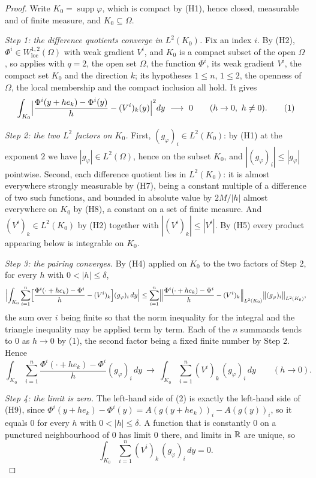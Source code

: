 \begin{proof}
Write $K_0=\operatorname{supp}\varphi$, which is compact by (H1), hence closed,
measurable and of finite measure, and $K_0\subseteq\Omega$.

\emph{Step 1: the difference quotients converge in $L^2(K_0)$.}  Fix an index
$i$.  By (H2), $\Phi^i\in W^{1,2}_{\mathrm{loc}}(\Omega)$ with weak gradient
$V^i$, and $K_0$ is a compact subset of the open $\Omega$, so
 applies with $q=2$, the open set
$\Omega$, the function $\Phi^i$, its weak gradient $V^i$, the compact set $K_0$
and the direction $k$; its hypotheses $1\le n$, $1\le2$, the openness of
$\Omega$, the local membership and the compact inclusion all hold.  It gives
\[
\int_{K_0}\Bigl|\frac{\Phi^i(y+he_k)-\Phi^i(y)}{h}-(V^i)_k(y)\Bigr|^2dy
\ \longrightarrow\ 0
\qquad(h\to0,\ h\ne0).
\tag{1}
\]

\emph{Step 2: the two $L^2$ factors on $K_0$.}  First,
$(g_\varphi)_i\in L^2(K_0)$: by (H1) at the exponent $2$ we have
$|g_\varphi|\in L^2(\Omega)$, hence on the subset $K_0$, and
$|(g_\varphi)_i|\le|g_\varphi|$ pointwise.  Second, each difference quotient
lies in $L^2(K_0)$: it is almost everywhere strongly measurable by (H7), being
a constant multiple of a difference of two such functions, and bounded in
absolute value by $2M/|h|$ almost everywhere on $K_0$ by (H8), a constant on a
set of finite measure.  And $(V^i)_k\in L^2(K_0)$ by (H2) together with
$|(V^i)_k|\le|V^i|$.  By (H5) every product appearing below is integrable on
$K_0$.

\emph{Step 3: the pairing converges.}  By (H4) applied on $K_0$ to the two
factors of Step 2, for every $h$ with $0<|h|\le\delta$,
\[
\Bigl|\int_{K_0}\sum_{i=1}^n\Bigl[\frac{\Phi^i(\cdot+he_k)-\Phi^i}{h}
-(V^i)_k\Bigr](g_\varphi)_i\,dy\Bigr|
\le\sum_{i=1}^n\Bigl\|\frac{\Phi^i(\cdot+he_k)-\Phi^i}{h}
-(V^i)_k\Bigr\|_{L^2(K_0)}\bigl\|(g_\varphi)_i\bigr\|_{L^2(K_0)},
\]
the sum over $i$ being finite so that the norm inequality for the integral and
the triangle inequality may be applied term by term.  Each of the $n$ summands
tends to $0$ as $h\to0$ by (1), the second factor being a fixed finite number
by Step 2.  Hence
\[
\int_{K_0}\sum_{i=1}^n\frac{\Phi^i(\cdot+he_k)-\Phi^i}{h}(g_\varphi)_i\,dy
\ \longrightarrow\
\int_{K_0}\sum_{i=1}^n(V^i)_k\,(g_\varphi)_i\,dy
\qquad(h\to0).
\tag{2}
\]

\emph{Step 4: the limit is zero.}  The left-hand side of (2) is exactly the
left-hand side of (H9), since
$\Phi^i(y+he_k)-\Phi^i(y)=A(g(y+he_k))_i-A(g(y))_i$, so it equals $0$ for
every $h$ with $0<|h|\le\delta$.  A function that is constantly $0$ on a
punctured neighbourhood of $0$ has limit $0$ there, and limits in $\mathbb{R}$ are
unique, so
\[
\int_{K_0}\sum_{i=1}^n(V^i)_k\,(g_\varphi)_i\,dy=0 .
\]


\end{proof}
